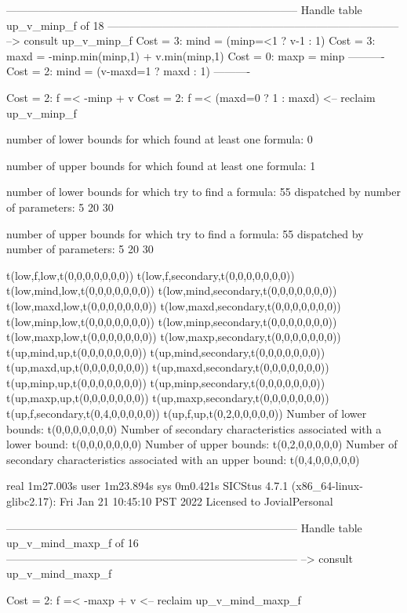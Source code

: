 --------------------------------------------------------------------------------
Handle table up_v_minp_f of 18
--------------------------------------------------------------------------------
--> consult up_v_minp_f
Cost =  3:  mind = (minp=<1 ? v-1 : 1)
Cost =  3:  maxd = -minp.min(minp,1) + v.min(minp,1)
Cost =  0:  maxp = minp
----------
Cost =  2:  mind = (v-maxd=1 ? maxd : 1)
----------

Cost =  2:  f =< -minp + v
Cost =  2:  f =< (maxd=0 ? 1 : maxd)
<-- reclaim up_v_minp_f

number of lower bounds for which found at least one formula: 0

number of upper bounds for which found at least one formula: 1

number of lower bounds for which try to find a formula: 55
dispatched by number of parameters: 5  20  30

number of upper bounds for which try to find a formula: 55
dispatched by number of parameters: 5  20  30

t(low,f,low,t(0,0,0,0,0,0,0))
t(low,f,secondary,t(0,0,0,0,0,0,0))
t(low,mind,low,t(0,0,0,0,0,0,0))
t(low,mind,secondary,t(0,0,0,0,0,0,0))
t(low,maxd,low,t(0,0,0,0,0,0,0))
t(low,maxd,secondary,t(0,0,0,0,0,0,0))
t(low,minp,low,t(0,0,0,0,0,0,0))
t(low,minp,secondary,t(0,0,0,0,0,0,0))
t(low,maxp,low,t(0,0,0,0,0,0,0))
t(low,maxp,secondary,t(0,0,0,0,0,0,0))
t(up,mind,up,t(0,0,0,0,0,0,0))
t(up,mind,secondary,t(0,0,0,0,0,0,0))
t(up,maxd,up,t(0,0,0,0,0,0,0))
t(up,maxd,secondary,t(0,0,0,0,0,0,0))
t(up,minp,up,t(0,0,0,0,0,0,0))
t(up,minp,secondary,t(0,0,0,0,0,0,0))
t(up,maxp,up,t(0,0,0,0,0,0,0))
t(up,maxp,secondary,t(0,0,0,0,0,0,0))
t(up,f,secondary,t(0,4,0,0,0,0,0))
t(up,f,up,t(0,2,0,0,0,0,0))
Number of lower bounds:                                             t(0,0,0,0,0,0,0)
Number of secondary characteristics associated with a lower bound:  t(0,0,0,0,0,0,0)
Number of upper bounds:                                             t(0,2,0,0,0,0,0)
Number of secondary characteristics associated with an upper bound: t(0,4,0,0,0,0,0)

real	1m27.003s
user	1m23.894s
sys	0m0.421s
SICStus 4.7.1 (x86_64-linux-glibc2.17): Fri Jan 21 10:45:10 PST 2022
Licensed to JovialPersonal


--------------------------------------------------------------------------------
Handle table up_v_mind_maxp_f of 16
--------------------------------------------------------------------------------
--> consult up_v_mind_maxp_f

Cost =  2:  f =< -maxp + v
<-- reclaim up_v_mind_maxp_f

